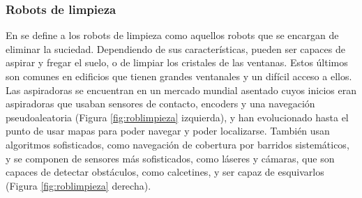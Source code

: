 \subsubsection{Robots de limpieza}
\label{subsubsec:robotlimpieza}

En \cite{plaza_robotica_servicio} se define a los robots de limpieza como aquellos robots que se encargan de eliminar la suciedad. Dependiendo de sus características, pueden ser capaces de aspirar y fregar el suelo, o de limpiar los cristales de las ventanas. Estos últimos son comunes en edificios que tienen grandes ventanales y un difícil acceso a ellos. Las aspiradoras se encuentran en un mercado mundial asentado cuyos inicios eran aspiradoras que usaban sensores de contacto, encoders y una navegación pseudoaleatoria (Figura \ref{fig:roblimpieza} izquierda), y han evolucionado hasta el punto de usar mapas para poder navegar y poder localizarse. También usan algoritmos sofisticados, como navegación de cobertura por barridos sistemáticos, y se componen de sensores más sofisticados, como láseres y cámaras, que son capaces de detectar obstáculos, como calcetines, y ser capaz de esquivarlos (Figura \ref{fig:roblimpieza} derecha).


